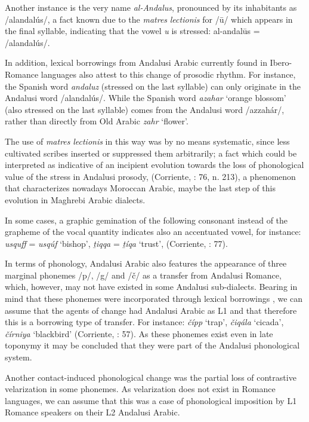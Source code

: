 \documentclass[output=paper,modfonts,nonflat]{langsci/langscibook}
\begin{document}
Another instance is the very name \textit{al-Andalus}, pronounced by its inhabitants as /alandalús/, a fact known due to the \textit{matres} \textit{lectionis} for /ū/ which appears in the final syllable, indicating that the vowel \textit{u} is stressed: {} al-andalūs = /alandalús/.

In addition, lexical borrowings from Andalusi Arabic currently found in Ibero-Romance languages also attest to this change of prosodic rhythm. For instance, the Spanish word \textit{andaluz} (stressed on the last syllable) can only originate in the Andalusi word /alandalús/. While the Spanish word \textit{azahar} ‘orange blossom’ (also stressed on the last syllable) comes from the Andalusi word /azzahár/, rather than directly from Old Arabic \textit{zahr} ‘flower’.

The use of \textit{matres} \textit{lectionis} in this way was by no means systematic, since {less cultivated scribes inserted or suppressed them arbitrarily}; a fact which could be interpreted as indicative of an incipient evolution towards the loss of phonological value of the stress in Andalusi prosody, (Corriente, \citealt{PereiraVicente2015}: 76, n. 213), a phenomenon that characterizes nowadays Moroccan Arabic, maybe the last step of this evolution in Maghrebi Arabic dialects.

{In some cases, a graphic gemination of the following consonant instead of the grapheme of the vocal quantity indicates also an accentuated vowel, for instance: \textit{usquff} = \textit{usqúf} ‘bishop’, \textit{ṯiqqa} = \textit{ṯíqa} ‘trust’,} {(Corriente, \citealt{PereiraVicente2015}: 77)}{.} 

In terms of phonology, Andalusi Arabic also features the appearance of three marginal phonemes /p/, /g/ and /č/ as a transfer from Andalusi Romance, which, however, may not have existed in some Andalusi sub-dialects. Bearing in mind that these phonemes were incorporated through lexical borrowings \citep{Corriente1978}, we can assume that the agents of change had Andalusi Arabic as L1 and that therefore this is a borrowing type of transfer. For instance: \textit{čípp} ‘trap’, \textit{čiqála} ‘cicada’, \textit{čírniya} ‘blackbird’ (Corriente, \citealt{PereiraVicente2015}: 57). As these phonemes exist even in late toponymy it may be concluded that they were part of the Andalusi phonological system. 

Another contact-induced phonological change was the partial loss of contrastive velarization in some phonemes. As velarization does not exist in Romance languages, we can assume that this was a case of phonological imposition by L1 Romance speakers on their L2 Andalusi Arabic. 
\end{document}

